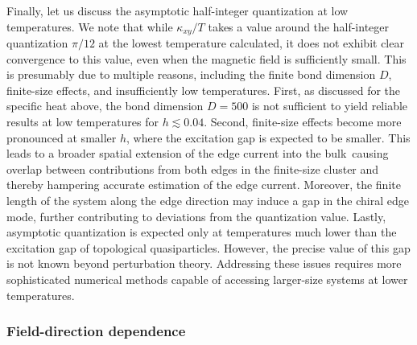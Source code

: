 \documentclass[twocolumn,superscriptaddress,showpacs, longbibliography, aps, prx]{revtex4-2}
\begin{document}
Finally, let us discuss the asymptotic half-integer quantization at low temperatures. 
We note that while $\kappa_{xy}/T$ takes a value around the half-integer quantization $\pi/12$ at the lowest temperature calculated, it does not exhibit clear convergence to this value, even when the magnetic field is sufficiently small.
This is presumably due to multiple reasons, including the finite bond dimension $D$, finite-size effects, and insufficiently low temperatures.
First, as discussed for the specific heat above, the bond dimension $D=500$ is not sufficient to yield reliable results at low temperatures for $h\lesssim0.04$.
Second, finite-size effects become more pronounced at smaller $h$, where the excitation gap is expected to be smaller. 
This leads to a broader spatial extension of the edge current into the bulk\, causing overlap between contributions from both edges in the finite-size cluster and thereby hampering accurate estimation of the edge current. 
Moreover, the finite length of the system along the edge direction may induce a gap in the chiral edge mode, further contributing to deviations from the quantization value. 
Lastly, asymptotic quantization is expected only at temperatures much lower than the excitation gap of topological quasiparticles. 
However, the precise value of this gap is not known beyond perturbation theory. 
Addressing these issues requires more sophisticated numerical methods capable of accessing larger-size systems at lower temperatures. 

\subsubsection{Field-direction dependence}
\label{subsec:field_direction_dep}
\end{document}
